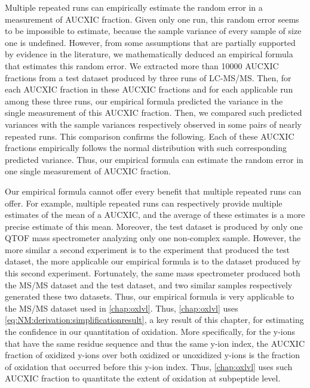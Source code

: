 Multiple repeated runs can empirically estimate the random error in a measurement of \gls{AUCXIC} fraction.
Given only one run, this random error seems to be impossible to estimate, because the sample variance of every sample of size one is undefined.
However, from some assumptions that are partially supported by evidence in the literature,
	we mathematically deduced an empirical formula that estimates this random error.
We extracted more than 10000 \gls{AUCXIC} fractions from a test dataset produced by three runs of \gls{LC-MS/MS}.{}
Then, for each \gls{AUCXIC} fraction in these \gls{AUCXIC} fractions and for each applicable run among these three runs,
	our empirical formula predicted the variance in the single measurement of this \gls{AUCXIC} fraction.{}
Then, we compared such predicted variances with the sample variances respectively observed in some pairs of nearly repeated runs.
This comparison confirms the following.
Each of these \gls{AUCXIC} fractions empirically follows the normal distribution with such corresponding predicted variance.
Thus, our empirical formula can estimate the random error in one single measurement of \gls{AUCXIC} fraction.
	
Our empirical formula cannot offer every benefit that multiple repeated runs can offer.{}
For example, multiple repeated runs can respectively provide multiple estimates of the mean of a \gls{AUCXIC}, 
	and the average of these estimates is a more precise estimate of this mean.
Moreover, the test dataset is produced by only one \gls{QTOF} mass spectrometer analyzing only one non-complex sample.
However, 
	the more similar a second experiment is to the experiment that produced the test dataset,
	the more applicable our empirical formula is to the dataset produced by this second experiment.{}
Fortunately, the same mass spectrometer produced both the \gls{MS/MS} dataset and the test dataset, 
	and two similar samples respectively generated these two datasets.{}
Thus, our empirical formula is very applicable to the \gls{MS/MS} dataset used in \cref{chap:oxlvl}.
Thus, \cref{chap:oxlvl} uses \cref{eq:NM:derivation:simplificationresult}, a key result of this chapter,
	for estimating the confidence in our quantitation of oxidation. %
More specifically, for the y-ions that have the same residue sequence and thus the same y-ion index,
	the \gls{AUCXIC} fraction of oxidized y-ions over both oxidized or unoxidized y-ions is the fraction of oxidation that occurred before this y-ion index.
Thus, \cref{chap:oxlvl} uses such \gls{AUCXIC} fraction to quantitate the extent of oxidation at subpeptide level.
		
